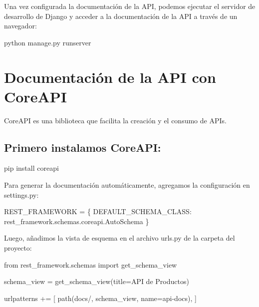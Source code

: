 \documentclass[
  a4paper,
  DIV=11,
  numbers=noendperiod,
  onepage,
  openany]{scrreprt}
\newenvironment{Shaded}{\begin{snugshade}}{\end{snugshade}}
\newcommand{\ExtensionTok}[1]{\textcolor[rgb]{0.00,0.23,0.31}{#1}}
\newcommand{\ImportTok}[1]{\textcolor[rgb]{0.00,0.46,0.62}{#1}}
\newcommand{\NormalTok}[1]{\textcolor[rgb]{0.00,0.23,0.31}{#1}}
\newcommand{\OperatorTok}[1]{\textcolor[rgb]{0.37,0.37,0.37}{#1}}
\newcommand{\StringTok}[1]{\textcolor[rgb]{0.13,0.47,0.30}{#1}}
\begin{document}
Una vez configurada la documentación de la API, podemos ejecutar el
servidor de desarrollo de Django y acceder a la documentación de la API
a través de un navegador:

\begin{Shaded}
\begin{Highlighting}[]
\ExtensionTok{python}\NormalTok{ manage.py runserver}
\end{Highlighting}
\end{Shaded}

\chapter{Documentación de la API con
CoreAPI}\label{documentaciuxf3n-de-la-api-con-coreapi}

CoreAPI es una biblioteca que facilita la creación y el consumo de APIs.

\section{Primero instalamos CoreAPI:}\label{primero-instalamos-coreapi}

\begin{Shaded}
\begin{Highlighting}[]
\ExtensionTok{pip}\NormalTok{ install coreapi}
\end{Highlighting}
\end{Shaded}

Para generar la documentación automáticamente, agregamos la
configuración en settings.py:

\begin{Shaded}
\begin{Highlighting}[]
\NormalTok{REST\_FRAMEWORK }\OperatorTok{=}\NormalTok{ \{}
    \StringTok{\textquotesingle{}DEFAULT\_SCHEMA\_CLASS\textquotesingle{}}\NormalTok{: }\StringTok{\textquotesingle{}rest\_framework.schemas.coreapi.AutoSchema\textquotesingle{}}
\NormalTok{\}}
\end{Highlighting}
\end{Shaded}

Luego, añadimos la vista de esquema en el archivo urls.py de la carpeta
del proyecto:

\begin{Shaded}
\begin{Highlighting}[]
\ImportTok{from}\NormalTok{ rest\_framework.schemas }\ImportTok{import}\NormalTok{ get\_schema\_view}

\NormalTok{schema\_view }\OperatorTok{=}\NormalTok{ get\_schema\_view(title}\OperatorTok{=}\StringTok{\textquotesingle{}API de Productos\textquotesingle{}}\NormalTok{)}

\NormalTok{urlpatterns }\OperatorTok{+=}\NormalTok{ [}
\NormalTok{    path(}\StringTok{\textquotesingle{}docs/\textquotesingle{}}\NormalTok{, schema\_view, name}\OperatorTok{=}\StringTok{\textquotesingle{}api{-}docs\textquotesingle{}}\NormalTok{),}
\NormalTok{]}
\end{Highlighting}
\end{Shaded}
\end{document}

